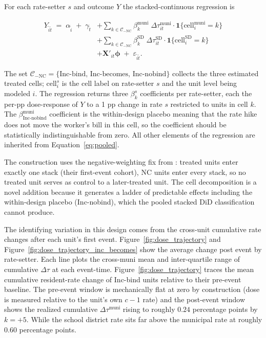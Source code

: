 \documentclass[12pt]{article}
\begin{document}
For each rate-setter $s$ and outcome $Y$ the stacked-continuous
regression is

\begin{equation}
\begin{split}
Y_{\tilde{i}\tilde{t}} \;=\; \alpha_{\tilde{i}} \;+\; \gamma_{\tilde{t}}
&+ \sum_{k \in \mathcal{C}_{-\text{NC}}} \beta^{\text{muni}}_k \;\Delta\tau^{\text{muni}}_{it} \cdot \mathbf{1}\{\text{cell}^{\text{muni}}_i = k\} \\
&+ \sum_{k \in \mathcal{C}_{-\text{NC}}} \beta^{\text{SD}}_k  \;\Delta\tau^{\text{SD}}_{it}   \cdot \mathbf{1}\{\text{cell}^{\text{SD}}_i = k\}   \\
&+ \mathbf{X}'_{it}\boldsymbol{\phi}
\;+\; \varepsilon_{\tilde{i}\tilde{t}}.
\end{split}
\label{eq:headline}
\end{equation}

The set
$\mathcal{C}_{-\text{NC}} = \{\text{Inc-bind, Inc-becomes, Inc-nobind}\}$
collects the three estimated treated cells; $\text{cell}^s_i$ is the cell label
on rate-setter $s$ and the unit level being modeled $i$. The regression returns three $\beta^s_k$
coefficients per rate-setter, each the per-pp dose-response of $Y$
to a 1 pp change in rate $s$ restricted to units in cell $k$. The
$\beta^{\text{muni}}_{\text{Inc-nobind}}$ coefficient is the
within-design placebo meaning that the rate hike
does not move the worker's bill in this cell, so the coefficient
should be statistically indistinguishable from zero. All other
elements of the regression are inherited from
Equation~\ref{eq:pooled}.

The construction uses the negative-weighting fix from
\citet{bakerDifferenceinDifferencesDesignsPractitioners2025}:
treated units enter exactly one stack (their first-event cohort),
NC units enter every stack, so no treated unit serves as control
to a later-treated unit. The cell decomposition is a
novel addition because it generates a ladder of predictable effects including the within-design placebo
(Inc-nobind), which the pooled stacked DiD
classification cannot produce.

The identifying variation in this design comes from the cross-unit cumulative rate changes after each unit's first
event. Figure~\ref{fig:dose_trajectory} and Figure~\ref{fig:dose_trajectory_inc_becomes}
show the average change post event by rate-setter. Each line plots the cross-muni mean and
inter-quartile range of cumulative $\Delta\tau$ at each event-time. Figure~\ref{fig:dose_trajectory}
traces the mean cumulative resident-rate change of Inc-bind units relative to their pre-event baseline. The
pre-event window is mechanically flat at zero by construction (dose
is measured relative to the unit's own $c-1$ rate) and the post-event
window shows the realized cumulative $\Delta\tau^{\text{muni}}$
rising to roughly $0.24$ percentage points by $k = +5$. While the school district rate sits far above the municipal rate at roughly $0.60$ percentage points.
\end{document}
